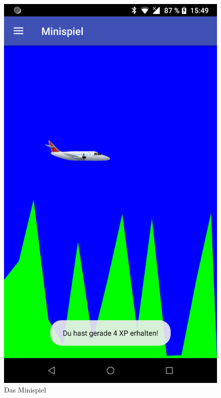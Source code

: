 \begin{multicols}{2}
\begin{figure}[H]
	\includegraphics[scale=0.1]{pics/device-game.png}
	\caption{Das Minispiel}
\end{figure}
\begin{figure}[H]
	\centering

\end{figure}
\end{multicols}

